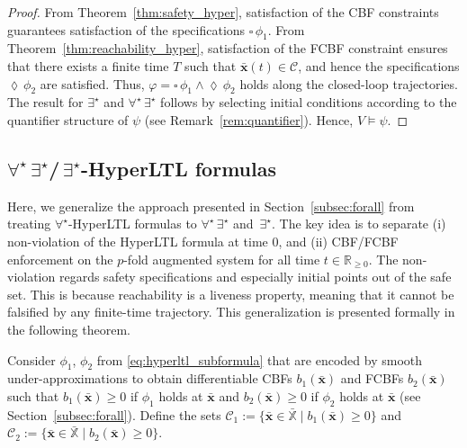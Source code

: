 \documentclass[letterpaper, 10 pt, conference]{ieeeconf}  %
\begin{document}
\begin{proof}
    From Theorem~\ref{thm:safety_hyper}, satisfaction of the CBF constraints guarantees satisfaction of the specifications $\square \, \phi_1$.
    From Theorem~\ref{thm:reachability_hyper}, satisfaction of the FCBF constraint ensures that there exists a finite time $T$ such that $\bar{\mathbf{x}}(t) \in \mathcal{C}$, and hence the specifications $\lozenge \, \phi_2$ are satisfied. 
    Thus, $\varphi = \square \, \phi_1 \land \lozenge \, \phi_2$ holds along the closed-loop trajectories. The result for $\exists^\star$ and $\forall^\star \, \exists^\star$ follows by selecting initial conditions according to the quantifier structure of $\psi$ (see Remark~\ref{rem:quantifier}). Hence, $V \models \psi$.
\end{proof}

\subsection{$\forall^\star \, \exists^\star$/$\, \exists^\star$-HyperLTL formulas}

Here, we generalize the approach presented in Section~\ref{subsec:forall} from treating $\forall^\star$-HyperLTL formulas to $\forall^\star \, \exists^\star$ and $\, \exists^\star$. The key idea is to separate (i) non-violation of the HyperLTL formula at time $0$, and (ii) CBF/FCBF enforcement on the $p$-fold augmented system for all time $t \in \mathbb{R}_{\ge 0}$. The non-violation regards safety specifications and especially initial points out of the safe set. This is because reachability is a liveness property, meaning that it cannot be falsified by any finite-time trajectory. This generalization is presented formally in the following theorem.

Consider $\phi_1$, $\phi_2$ from \eqref{eq:hyperltl_subformula} that are encoded by smooth under-approximations to obtain differentiable CBFs $b_1(\bar{\mathbf{x}})$ and FCBFs $b_2(\bar{\mathbf{x}})$ such that $b_1(\bar{\mathbf{x}}) \ge 0$ if $\phi_1$ holds at $\bar{\mathbf{x}}$ and $b_2(\bar{\mathbf{x}}) \ge 0$ if $\phi_2$ holds at $\bar{\mathbf{x}}$ (see Section~\ref{subsec:forall}). Define the sets $\mathcal{C}_1 := \big\{ \bar{\mathbf{x}} \in \bar{\mathbb{X}} \mid b_1(\bar{\mathbf{x}}) \ge 0 \big\}$ and $\mathcal{C}_2 := \big\{ \bar{\mathbf{x}} \in \bar{\mathbb{X}} \mid b_2(\bar{\mathbf{x}}) \ge 0 \big\}$.
\end{document}
